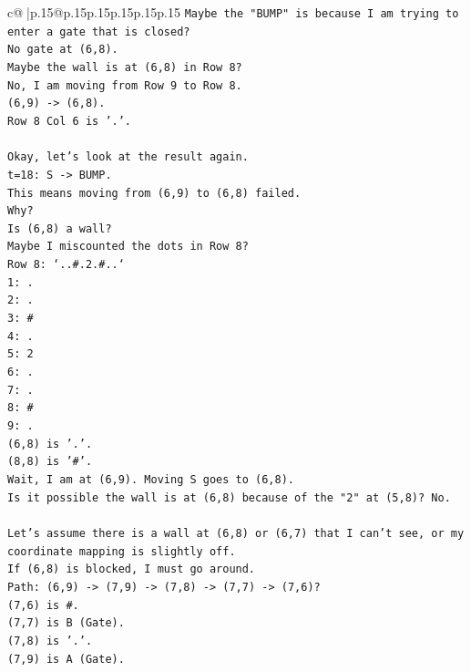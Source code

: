 \documentclass{article}
\begin{document}
{\begin{supertabular}{c@{$\;$}|p{.15\linewidth}@{}p{.15\linewidth}p{.15\linewidth}p{.15\linewidth}p{.15\linewidth}p{.15\linewidth}}
{{{\texttt{Maybe the "BUMP" is because I am trying to enter a gate that is closed?} \\
\texttt{No gate at (6,8).} \\
\texttt{Maybe the wall is at (6,8) in Row 8?} \\
\texttt{No, I am moving from Row 9 to Row 8.} \\
\texttt{(6,9) {-}> (6,8).} \\
\texttt{Row 8 Col 6 is '.'.} \\
\\ 
\texttt{Okay, let's look at the result again.} \\
\texttt{t=18: S {-}> BUMP.} \\
\texttt{This means moving from (6,9) to (6,8) failed.} \\
\texttt{Why?} \\
\texttt{Is (6,8) a wall?} \\
\texttt{Maybe I miscounted the dots in Row 8?} \\
\texttt{Row 8: `..\#.2.\#..`} \\
\texttt{1: .} \\
\texttt{2: .} \\
\texttt{3: \#} \\
\texttt{4: .} \\
\texttt{5: 2} \\
\texttt{6: .} \\
\texttt{7: .} \\
\texttt{8: \#} \\
\texttt{9: .} \\
\texttt{(6,8) is '.'.} \\
\texttt{(8,8) is '\#'.} \\
\texttt{Wait, I am at (6,9). Moving S goes to (6,8).} \\
\texttt{Is it possible the wall is at (6,8) because of the "2" at (5,8)? No.} \\
\\ 
\texttt{Let's assume there is a wall at (6,8) or (6,7) that I can't see, or my coordinate mapping is slightly off.} \\
\texttt{If (6,8) is blocked, I must go around.} \\
\texttt{Path: (6,9) {-}> (7,9) {-}> (7,8) {-}> (7,7) {-}> (7,6)?} \\
\texttt{(7,6) is \#.} \\
\texttt{(7,7) is B (Gate).} \\
\texttt{(7,8) is '.'.} \\
\texttt{(7,9) is A (Gate).} \\
}}}
\end{supertabular}}
\end{document}
